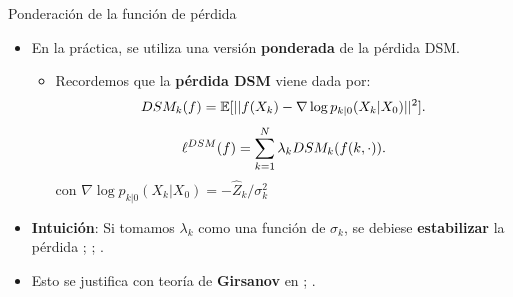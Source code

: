 \documentclass[aspectratio=169,xcolor=dvipsnames, t, spanish]{beamer}
\begin{document}
    \begin{frame}{Ponderación de la función de pérdida}
        \begin{itemize}
            \item En la práctica, se utiliza una versión \textbf{ponderada} de la pérdida DSM.
            \begin{itemize}
                \item Recordemos que la \textbf{pérdida DSM} viene dada por:\vspace{-2mm}
                \[ DSM_{k}(f)=\mathbb{E}[||f(X_{k})-\nabla \log p_{k|0}(X_{k}|X_{0})||^{2}]. \vspace{-2mm}\]
                \[ \ell^{DSM}(f)=\sum_{k=1}^{N}\lambda_{k}DSM_{k}(f(k,\cdot)). \vspace{-2mm}\]
                con $\nabla \log p_{k|0}(X_{k}|X_{0})=-\hat{Z}_{k}/\sigma_{k}^{2}$
            \end{itemize}
            \item \textbf{Intuición}: Si tomamos $\lambda_{k}$ como una función de $\sigma_{k}$, se debiese \textbf{estabilizar} la pérdida \citet{Song2020b}; \citet{Ho2020}; \citet{NicholDhariwal2021}.
            
            \item Esto se justifica con teoría de \textbf{Girsanov} en \citet{Song2021}; \citet{Huang2021}.
        \end{itemize}
    \end{frame}
    
\end{document}
